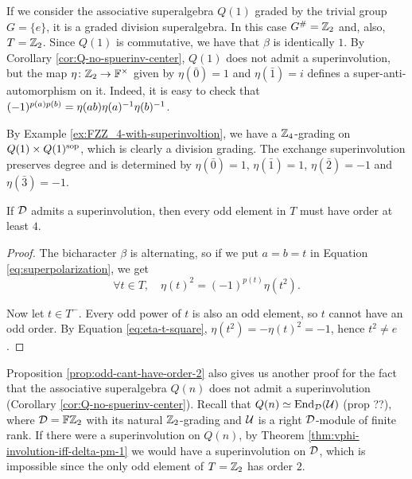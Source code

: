 \begin{ex}
    If we consider the associative superalgebra $Q(1)$ graded by the trivial group $G = \{e\}$, it is a graded division superalgebra. 
    In this case $G^\# = \mathbb{Z}_2$ and, also, $T = \mathbb{Z}_2$. 
    Since $Q(1)$ is commutative, we have that $\beta$ is identically $1$.
    By Corollary \ref{cor:Q-no-spuerinv-center}, $Q(1)$ does not admit a superinvolution, but the map $\eta\colon \mathbb{Z}_2 \to \mathbb{F}^\times$ given by $\eta (\bar 0) = 1$ and $\eta( \bar 1) = i$ defines a super-anti-automorphism on it. 
    Indeed, it is easy to check that $(-1)^{p(a) p(b)} =  \eta(ab) \eta(a)^{-1} \eta(b)^{-1}$.
\end{ex}

\begin{ex}
    By Example \ref{ex:FZZ_4-with-superinvoltion}, we have a $\mathbb{Z}_4$-grading on $Q(1)\times Q(1)^{\mathrm{sop}}$, which is clearly a division grading. 
    The exchange superinvolution preserves degree and is determined by $\eta (\bar 0) = 1$, $\eta (\bar 1) = 1$, $\eta (\bar 2) = -1$ and $\eta (\bar 3) = -1$.
\end{ex}

\begin{prop}\label{prop:odd-cant-have-order-2}
    If $\mathcal{D}$ admits a superinvolution, %
    then every odd element in $T$ must have order at least $4$.
\end{prop}

\begin{proof}
    The bicharacter $\beta$ is alternating, so if we put $a = b = t$ in Equation \eqref{eq:superpolarization}, we get
    \begin{equation}\label{eq:eta-t-square}
        \forall t\in T, \quad \eta (t)^2 = (-1)^{p(t)} \eta(t^2).
    \end{equation}
    
    Now let $t\in T^-$. 
    Every odd power of $t$ is also an odd element, so $t$ cannot have an odd order. 
    By Equation \eqref{eq:eta-t-square}, $\eta (t^2) = - \eta(t)^2 = -1$, hence $t^2 \neq e$.
\end{proof}

\begin{remark}
    Proposition \ref{prop:odd-cant-have-order-2} also gives us another proof for the fact that the associative superalgebra $Q(n)$ does not admit a superinvolution (Corollary \ref{cor:Q-no-spuerinv-center}). 
    Recall that $Q(n) \simeq \operatorname{End}_{\mathcal{D}} (\mathcal U)$ (prop ??), where $\mathcal{D}= \mathbb{F}\mathbb{Z}_2$ with its natural $\mathbb{Z}_2$-grading and $\mathcal U$ is a right $\mathcal{D}$-module of finite rank. 
    If there were a superinvolution on $Q(n)$, by Theorem \ref{thm:vphi-involution-iff-delta-pm-1} we would have a superinvolution on $\mathcal{D}$, which is impossible since the only odd element of $T = \mathbb{Z}_2$ has order $2$. 
\end{remark}


